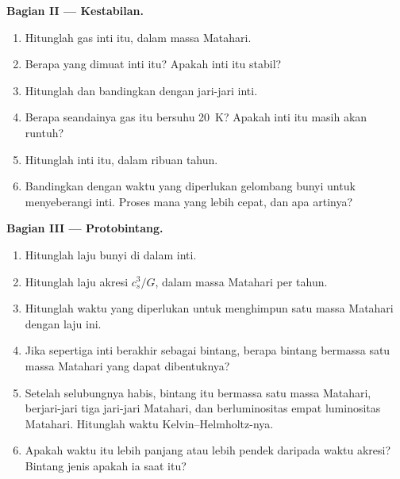 \begin{problem}
\noindent\textbf{Bagian II --- Kestabilan.}
\begin{enumerate}[resume]
  \item Hitunglah  gas inti itu, dalam massa Matahari.
  \item Berapa  yang dimuat inti itu? Apakah inti itu stabil?
  \item Hitunglah  dan bandingkan dengan jari-jari inti.
  \item Berapa  seandainya gas itu bersuhu \qty{20}{K}? Apakah
        inti itu masih akan runtuh?
  \item Hitunglah  inti itu, dalam ribuan tahun.
  \item Bandingkan dengan waktu yang diperlukan gelombang bunyi untuk menyeberangi inti. Proses
        mana yang lebih cepat, dan apa artinya?
\end{enumerate}

\noindent\textbf{Bagian III --- Protobintang.}
\begin{enumerate}[resume]
  \item Hitunglah laju bunyi di dalam inti.
  \item Hitunglah laju akresi $c_s^3/G$, dalam massa Matahari per tahun.
  \item Hitunglah waktu yang diperlukan untuk menghimpun satu massa Matahari dengan laju ini.
  \item Jika sepertiga inti berakhir sebagai bintang, berapa bintang bermassa satu massa
        Matahari yang dapat dibentuknya?
  \item Setelah selubungnya habis, bintang itu bermassa satu massa Matahari, berjari-jari tiga
        jari-jari Matahari, dan berluminositas empat luminositas Matahari. Hitunglah waktu Kelvin--Helmholtz-nya.
  \item Apakah waktu itu lebih panjang atau lebih pendek daripada waktu akresi? Bintang jenis apakah
        ia saat itu?
\end{enumerate}


\end{problem}
